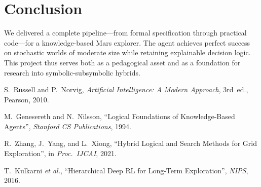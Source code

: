 \documentclass[12pt]{article}
\begin{document}
\section{Conclusion}\label{sec:conclusion}
We delivered a complete pipeline—from formal specification through practical
code—for a knowledge-based Mars explorer.
The agent achieves perfect success on stochastic worlds of moderate size
while retaining explainable decision logic.
This project thus serves both as a pedagogical asset and as a foundation for
research into symbolic-subsymbolic hybrids.


\begin{thebibliography}{9}
  S.~Russell and P.~Norvig,
  \emph{Artificial Intelligence: A Modern Approach},
  3rd~ed., Pearson, 2010.

  M.~Genesereth and N.~Nilsson,
  ``Logical Foundations of Knowledge-Based Agents'',
  \emph{Stanford CS Publications}, 1994.

  R.~Zhang, J.~Yang, and L.~Xiong,
  ``Hybrid Logical and Search Methods for Grid Exploration'',
  in \emph{Proc.\ IJCAI}, 2021.

  T.~Kulkarni \emph{et al.},
  ``Hierarchical Deep RL for Long-Term Exploration'',
  \emph{NIPS}, 2016.
\end{thebibliography}
\end{document}
